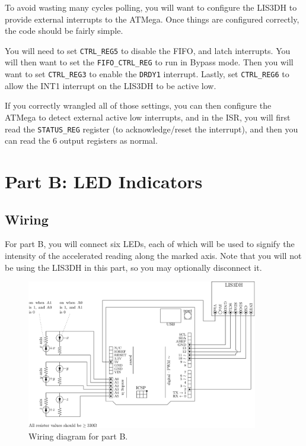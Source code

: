 \documentclass{article}
\begin{document}
To avoid wasting many cycles polling, you will want to configure the LIS3DH to provide external interrupts to the ATMega. Once things are configured correctly, the code should be fairly simple.

You will need to set \texttt{CTRL\_REG5} to disable the FIFO, and latch interrupts. You will then want to set the \texttt{FIFO\_CTRL\_REG} to run in Bypass mode. Then you will want to set \texttt{CTRL\_REG3} to enable the \texttt{DRDY1} interrupt. Lastly, set \texttt{CTRL\_REG6} to allow the INT1 interrupt on the LIS3DH to be active low.

If you correctly wrangled all of those settings, you can then configure the ATMega to detect external active low interrupts, and in the ISR, you will first read the \texttt{STATUS\_REG} register (to acknowledge/reset the interrupt), and then you can read the 6 output registers as normal.


\section{Part B: LED Indicators}

\subsection{Wiring}

For part B, you will connect six LEDs, each of which will be used to signify
the intensity of the accelerated reading along the marked axis. Note that you
will not be using the LIS3DH in this part, so you may optionally disconnect it.

\begin{figure}[H]
	\centering

	\includegraphics[max width = 0.9\textwidth]{part_b_wiring.pdf}

	\caption{Wiring diagram for part B.}

\end{figure}
\end{document}
